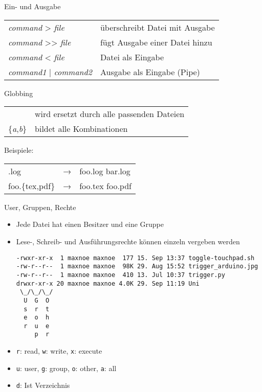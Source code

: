 \begin{frame}{Ein- und Ausgabe}
  \begin{tabu}{>{\ttfamily}l X[,L]}
    \textit{command} > \textit{file}      & überschreibt Datei mit Ausgabe \\
    \textit{command} >> \textit{file}     & fügt Ausgabe einer Datei hinzu \\
    \textit{command} < \textit{file}      & Datei als Eingabe \\
    \textit{command1} | \textit{command2} & Ausgabe als Eingabe (Pipe)
  \end{tabu}
\end{frame}

\begin{frame}{Globbing}
  \begin{tabu}{>{\ttfamily}l X[,L]}
    *                         & wird ersetzt durch alle passenden Dateien \\
    \{\textit{a},\textit{b}\} & bildet alle Kombinationen
  \end{tabu}

  \vspace{2cm}
  Beispiele:\\[10pt]
  \begin{tabu}{>{\ttfamily}l c >{\ttfamily}l}
    *.log           & → & foo.log bar.log \\
    foo.\{tex,pdf\} & → & foo.tex foo.pdf
  \end{tabu}
\end{frame}

\begin{frame}[fragile]{User, Gruppen, Rechte}
  \begin{itemize}
    \item Jede Datei hat einen Besitzer und eine Gruppe
    \item Lese-, Schreib- und Ausführungsrechte können einzeln vergeben werden
    \begin{verbatim}
-rwxr-xr-x  1 maxnoe maxnoe  177 15. Sep 13:37 toggle-touchpad.sh
-rw-r--r--  1 maxnoe maxnoe  98K 29. Aug 15:52 trigger_arduino.jpg
-rw-r--r--  1 maxnoe maxnoe  410 13. Jul 10:37 trigger.py
drwxr-xr-x 20 maxnoe maxnoe 4.0K 29. Sep 11:19 Uni
 \_/\_/\_/
  U  G  O
  s  r  t
  e  o  h
  r  u  e
     p  r
    \end{verbatim}
    \item \texttt{r}: read, \texttt{w}: write, \texttt{x}: execute 
    \item \texttt{u}: user, \texttt{g}: group, \texttt{o}: other, \texttt{a}: all 
    \item \texttt{d}: Ist Verzeichnis
  \end{itemize}
  
\end{frame}

